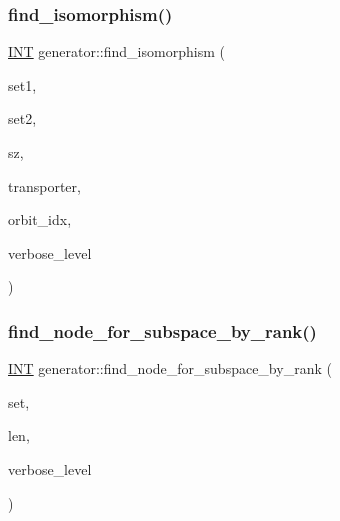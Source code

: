 \mbox{\label{classgenerator_a12bc0e823d0faf0e38e7b28d279339ac}} 
\subsubsection{\texorpdfstring{find\+\_\+isomorphism()}{find\_isomorphism()}}
{\footnotesize\ttfamily \mbox{\hyperlink{galois_8h_a09fddde158a3a20bd2dcadb609de11dc}{I\+NT}} generator\+::find\+\_\+isomorphism (\begin{DoxyParamCaption}\item[{\mbox{\hyperlink{galois_8h_a09fddde158a3a20bd2dcadb609de11dc}{I\+NT}} $\ast$}]{set1,  }\item[{\mbox{\hyperlink{galois_8h_a09fddde158a3a20bd2dcadb609de11dc}{I\+NT}} $\ast$}]{set2,  }\item[{\mbox{\hyperlink{galois_8h_a09fddde158a3a20bd2dcadb609de11dc}{I\+NT}}}]{sz,  }\item[{\mbox{\hyperlink{galois_8h_a09fddde158a3a20bd2dcadb609de11dc}{I\+NT}} $\ast$}]{transporter,  }\item[{\mbox{\hyperlink{galois_8h_a09fddde158a3a20bd2dcadb609de11dc}{I\+NT}} \&}]{orbit\+\_\+idx,  }\item[{\mbox{\hyperlink{galois_8h_a09fddde158a3a20bd2dcadb609de11dc}{I\+NT}}}]{verbose\+\_\+level }\end{DoxyParamCaption})}

\mbox{\label{classgenerator_ad118a5102c2f16c7bed14ee432fe70b2}} 
\subsubsection{\texorpdfstring{find\+\_\+node\+\_\+for\+\_\+subspace\+\_\+by\+\_\+rank()}{find\_node\_for\_subspace\_by\_rank()}}
{\footnotesize\ttfamily \mbox{\hyperlink{galois_8h_a09fddde158a3a20bd2dcadb609de11dc}{I\+NT}} generator\+::find\+\_\+node\+\_\+for\+\_\+subspace\+\_\+by\+\_\+rank (\begin{DoxyParamCaption}\item[{\mbox{\hyperlink{galois_8h_a09fddde158a3a20bd2dcadb609de11dc}{I\+NT}} $\ast$}]{set,  }\item[{\mbox{\hyperlink{galois_8h_a09fddde158a3a20bd2dcadb609de11dc}{I\+NT}}}]{len,  }\item[{\mbox{\hyperlink{galois_8h_a09fddde158a3a20bd2dcadb609de11dc}{I\+NT}}}]{verbose\+\_\+level }\end{DoxyParamCaption})}

